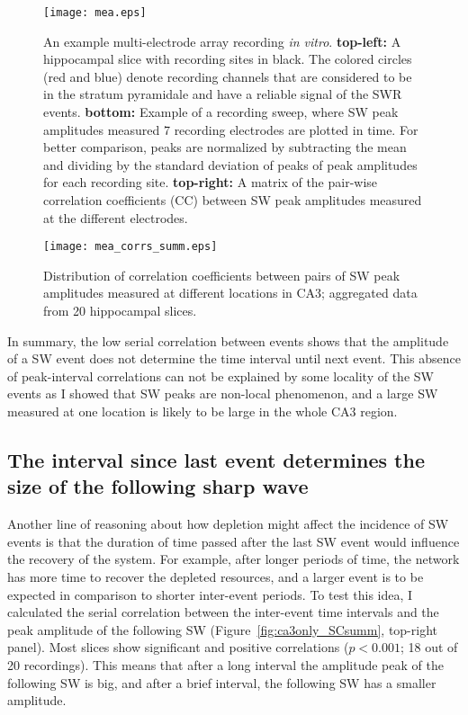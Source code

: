     \begin{figure}
      \center
      \texttt{[image: mea.eps]}
      \caption{
        An example multi-electrode array recording {\it in vitro}.
        \textbf{top-left:} A hippocampal slice with recording sites in black.
        The colored circles (red and blue) denote recording channels that are
        considered to be in the stratum pyramidale and have a reliable signal
        of the SWR events. \textbf{bottom:} Example of a recording
        sweep, where SW peak amplitudes measured 7 recording electrodes are
        plotted in time. For better comparison, peaks are normalized by
        subtracting the mean and dividing by the standard deviation of peaks of
        peak amplitudes for each recording site.  \textbf{top-right:} A matrix
        of the pair-wise correlation coefficients (CC) between SW peak
        amplitudes measured at the different electrodes.
      }
    \label{fig:peak_correlation_ex}
    \end{figure}

    \begin{figure}
    \centering
      \texttt{[image: mea\_corrs\_summ.eps]}
      \caption{
        Distribution of correlation coefficients between pairs of SW peak
        amplitudes measured at different locations in CA3; aggregated data from
        20 hippocampal slices.
             }
    \label{fig:peak_correlation_summ}
    \end{figure}
    
    In summary, the low serial correlation between events shows that the
    amplitude of a SW event does not determine the time interval until next
    event. This absence of peak-interval correlations can not be explained by
    some locality of the SW events as I showed that SW peaks are non-local
    phenomenon, and a large SW measured at one location is likely to be large
    in the whole CA3 region.
    
  \subsection{The interval since last event determines the size of the following sharp wave}
    \label{sec:swr_int-amp}
    Another line of reasoning about how depletion might affect the incidence of
    SW events is that the duration of time passed after the last SW event would
    influence the recovery of the system. For example, after longer periods of
    time, the network has more time to recover the depleted resources, and a
    larger event is to be expected in comparison to shorter inter-event
    periods. To test this idea, I calculated the serial correlation between the
    inter-event time intervals and the peak amplitude of the following SW
    (Figure~\ref{fig:ca3only_SCsumm}, top-right panel). Most slices show
    significant and positive correlations ($p<0.001$; 18 out of 20 recordings).
    This means that after a long interval the amplitude peak of the following
    SW is big, and after a brief interval, the following SW has a
    smaller amplitude. 

